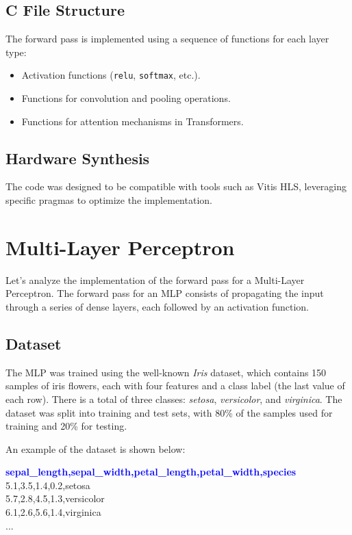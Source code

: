 \documentclass{article}
\begin{document}
\subsection{C File Structure}
The forward pass is implemented using a sequence of functions for each layer type:
\begin{itemize}
    \item Activation functions (\texttt{relu}, \texttt{softmax}, etc.).
    \item Functions for convolution and pooling operations.
    \item Functions for attention mechanisms in Transformers.
\end{itemize}


\subsection{Hardware Synthesis}
The code was designed to be compatible with tools such as Vitis HLS, leveraging specific pragmas to optimize the implementation.

\section{Multi-Layer Perceptron}
Let's analyze the implementation of the forward pass for a Multi-Layer Perceptron. The forward pass for an MLP consists of propagating the input through a series of dense layers, each followed by an activation function.

\subsection{Dataset}
The MLP was trained using the well-known \textit{Iris} dataset, which contains 150 samples of iris flowers, each with four features and a class label (the last value of each row).
There is a total of three classes: \textit{setosa}, \textit{versicolor}, and \textit{virginica}.
The dataset was split into training and test sets, with 80\% of the samples used for training and 20\% for testing.

An example of the dataset is shown below:

\begin{tcolorbox}[colback=gray!5, colframe=black, rounded corners, boxrule=0.1mm]
\textbf{\textcolor{blue}{sepal\_length,sepal\_width,petal\_length,petal\_width,species}} \\
5.1,3.5,1.4,0.2,setosa \\
5.7,2.8,4.5,1.3,versicolor \\
6.1,2.6,5.6,1.4,virginica \\
...
\end{tcolorbox}
\end{document}
